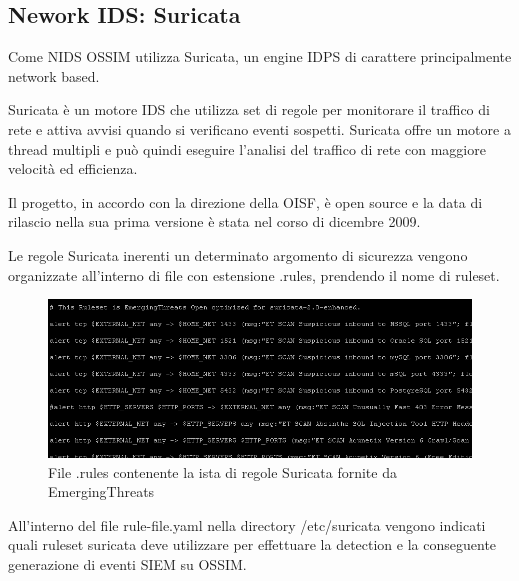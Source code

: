 \subsection{Nework IDS: Suricata}

Come NIDS OSSIM utilizza Suricata, un engine IDPS di carattere principalmente network based.\par
Suricata è un motore IDS che utilizza set di regole per monitorare il traffico di rete e attiva avvisi quando si verificano eventi sospetti. Suricata offre un motore a thread multipli e può quindi eseguire l'analisi del traffico di rete con maggiore velocità ed efficienza.\par
Il progetto, in accordo con la direzione della OISF, è open source e la data di rilascio nella sua prima versione è stata nel corso di dicembre 2009.\par
Le regole Suricata inerenti un determinato argomento di sicurezza vengono organizzate all'interno di file con estensione .rules, prendendo il nome di ruleset. 

 \begin{figure}[h]
    \begin{center}
        \includegraphics[width=0.98\columnwidth]{images/4_caso_d'uso_img/suricataRuleSet.png}
    \end{center}
    \caption{File .rules contenente la ista di regole Suricata fornite da EmergingThreats}
    \label{fig:File .rules contenente la ista di regole Suricata fornite da EmergingThreats}
\end{figure}

\newpage

All’interno del file rule-file.yaml nella directory /etc/suricata vengono indicati quali ruleset suricata deve utilizzare per effettuare la detection e la conseguente generazione di eventi SIEM su OSSIM.

